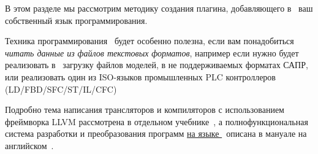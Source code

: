 \label{script}\secdown

В этом разделе мы рассмотрим методику создания плагина, добавляющего в
\vrep\ ваш собственный язык программирования. 

\begin{framed}\noindent
Техника программирования \ будет особенно 
полезна, если вам понадобиться \emph{читать данные из файлов текстовых
форматов}, например если
нужно будет реализовать в \vrep\ загрузку файлов моделей, в не поддерживаемых
форматах САПР, или реализовать один из ISO-языков промышленных PLC контроллеров
(LD/FBD/SFC/ST/IL/CFC)
\end{framed}

Подробно тема написания трансляторов и компиляторов с использованием 
фреймворка LLVM рассмотрена в отдельном учебнике\ \cite{lexman},
а полнофункциональная система разработки и преобразования программ 
\href{https://github.com/ponyatov/Y}{на языке \bi}\ описана в 
мануале на английском\ \cite{biman}.





\secup
